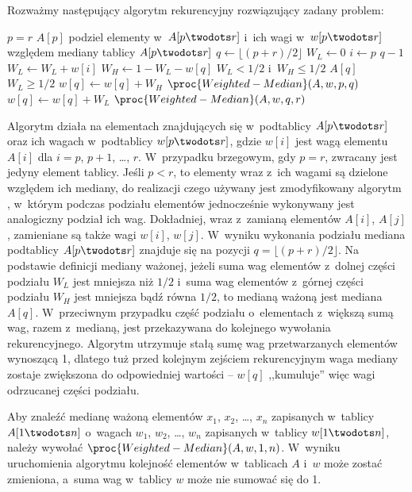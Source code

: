 \subproblem %
Rozważmy następujący algorytm rekurencyjny rozwiązujący zadany problem:
\begin{codebox}
\li	\If $p=r$
\li		\Then \Return $A[p]$
		\End
\li	podziel elementy w~$A[p\twodots r]$ i~ich wagi w~$w[p\twodots r]$ względem mediany tablicy $A[p\twodots r]$ \label{li:weighted-median-partition}
\li	$q\gets\lfloor(p+r)/2\rfloor$
\li	$W_L\gets0$
\li	\For $i\gets p$ \To $q-1$
\li		\Do $W_L\gets W_L+w[i]$
		\End
\li	$W_H\gets1-W_L-w[q]$
\li	\If $W_L<1/2$ i~$W_H\le1/2$
\li		\Then \Return $A[q]$
		\End
\li	\If $W_L\ge1/2$
\li		\Then $w[q]\gets w[q]+W_H$
\li			\Return $\proc{Weighted-Median}(A,w,p,q)$
\li		\Else $w[q]\gets w[q]+W_L$
\li			\Return $\proc{Weighted-Median}(A,w,q,r)$
		\End
\end{codebox}
Algorytm działa na elementach znajdujących się w~podtablicy $A[p\twodots r]$ oraz ich wagach w~podtablicy $w[p\twodots r]$, gdzie $w[i]$ jest wagą elementu $A[i]$ dla $i=p$, $p+1$, \dots, $r$.
W~przypadku brzegowym, gdy $p=r$, zwracany jest jedyny element tablicy.
Jeśli $p<r$, to elementy wraz z~ich wagami są dzielone względem ich mediany, do realizacji czego używany jest zmodyfikowany algorytm , w~którym podczas podziału elementów jednocześnie wykonywany jest analogiczny podział ich wag.
Dokładniej, wraz z~zamianą elementów $A[i]$, $A[j]$, zamieniane są także wagi $w[i]$, $w[j]$.
W~wyniku wykonania podziału mediana podtablicy $A[p\twodots r]$ znajduje się na pozycji $q=\lfloor(p+r)/2\rfloor$.
Na podstawie definicji mediany ważonej, jeżeli suma wag elementów z~dolnej części podziału $W_L$ jest mniejsza niż $1/2$ i~suma wag elementów z~górnej części podziału $W_H$ jest mniejsza bądź równa $1/2$, to medianą ważoną jest mediana $A[q]$.
W~przeciwnym przypadku część podziału o~elementach z~większą sumą wag, razem z~medianą, jest przekazywana do kolejnego wywołania rekurencyjnego.
Algorytm utrzymuje stałą sumę wag przetwarzanych elementów wynoszącą 1, dlatego tuż przed kolejnym zejściem rekurencyjnym waga mediany zostaje zwiększona do odpowiedniej wartości -- $w[q]$ ,,kumuluje'' więc wagi odrzucanej części podziału.

Aby znaleźć medianę ważoną elementów $x_1$, $x_2$, \dots, $x_n$ zapisanych w~tablicy $A[1\twodots n]$ o~wagach $w_1$, $w_2$, \dots, $w_n$ zapisanych w~tablicy $w[1\twodots n]$, należy wywołać $\proc{Weighted-Median}(A,w,1,n)$.
W~wyniku uruchomienia algorytmu kolejność elementów w~tablicach $A$ i~$w$ może zostać zmieniona, a~suma wag w~tablicy $w$ może nie sumować się do 1.

